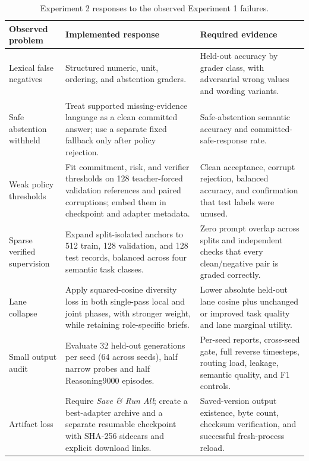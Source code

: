 \documentclass[10pt,a4paper]{article}
\begin{document}
\begin{table}[htbp]
\caption{Experiment 2 responses to the observed Experiment 1 failures.}
\label{tab:study2resp}
\centering\footnotesize
\begin{tabularx}{\textwidth}{@{}>{\raggedright\arraybackslash}p{}XX@{}}
\toprule
\textbf{Observed problem} & \textbf{Implemented response} & \textbf{Required evidence} \\
\midrule
Lexical false negatives & Structured numeric, unit, ordering, and abstention graders. & Held-out accuracy by grader class, with adversarial wrong values and wording variants. \\
Safe abstention withheld & Treat supported missing-evidence language as a clean committed answer; use a separate fixed fallback only after policy rejection. & Safe-abstention semantic accuracy and committed-safe-response rate. \\
Weak policy thresholds & Fit commitment, risk, and verifier thresholds on 128 teacher-forced validation references and paired corruptions; embed them in checkpoint and adapter metadata. & Clean acceptance, corrupt rejection, balanced accuracy, and confirmation that test labels were unused. \\
Sparse verified supervision & Expand split-isolated anchors to 512 train, 128 validation, and 128 test records, balanced across four semantic task classes. & Zero prompt overlap across splits and independent checks that every clean/negative pair is graded correctly. \\
Lane collapse & Apply squared-cosine diversity loss in both single-pass local and joint phases, with stronger weight, while retaining role-specific briefs. & Lower absolute held-out lane cosine plus unchanged or improved task quality and lane marginal utility. \\
Small output audit & Evaluate 32 held-out generations per seed (64 across seeds), half narrow probes and half Reasoning9000 episodes. & Per-seed reports, cross-seed gate, full reverse timesteps, routing load, leakage, semantic quality, and F1 controls. \\
Artifact loss & Require \emph{Save \& Run All}; create a best-adapter archive and a separate resumable checkpoint with SHA-256 sidecars and explicit download links. & Saved-version output existence, byte count, checksum verification, and successful fresh-process reload. \\
\bottomrule
\end{tabularx}
\end{table}
\end{document}

